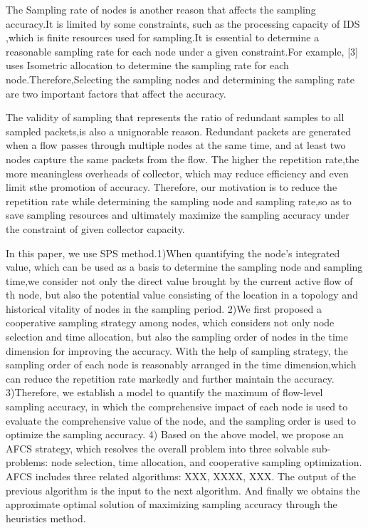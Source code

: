 \documentclass[conference]{IEEEtran}
\begin{document}
The Sampling rate of nodes is another reason that affects the sampling accuracy.It is limited by some constraints, such as the processing capacity of IDS ,which is finite resources used for sampling.It is essential to determine a reasonable sampling rate for each node under a given constraint.For example, [3] uses Isometric allocation to determine the sampling rate for each node.Therefore,Selecting the sampling nodes and determining the sampling rate are two important factors that affect the accuracy. 

The validity of sampling that represents the ratio of  redundant samples to all sampled packets,is also a unignorable reason. Redundant packets are generated when a flow passes through multiple nodes at the same time, and at least two nodes capture the same packets from the flow.
The higher the repetition rate,the more meaningless overheads of collector, which may reduce efficiency and even limit sthe promotion of accuracy. 
Therefore, our motivation is to reduce the repetition rate while determining the sampling node and sampling rate,so as to save sampling resources and ultimately maximize the sampling accuracy under the constraint of given collector capacity.

In this paper, we use SPS method.1)When quantifying the node's integrated value, which can be used as a basis to determine the sampling node and sampling time,we consider not only the direct value brought by the current active flow of th node, but also the potential value consisting of the location in a topology and historical vitality of nodes in the sampling period.
2)We first proposed a cooperative sampling strategy among nodes, which considers not only node selection and time allocation, but also the sampling order of nodes in the time dimension for improving the accuracy. With the help of sampling strategy, the sampling order of each node is reasonably arranged in the time dimension,which can reduce the repetition rate markedly and further maintain the accuracy.
3)Therefore, we establish a model to quantify the maximum of  flow-level sampling accuracy, in which  the comprehensive impact of each node is used to evaluate the comprehensive value of the node, and the sampling order is used to optimize the sampling accuracy.
4) Based on the above model, we propose an AFCS strategy, which resolves the overall problem into three solvable sub-problems: node selection, time allocation, and cooperative sampling optimization. AFCS includes three related algorithms: XXX, XXXX, XXX. The output of the previous algorithm is the input to the next algorithm. And finally we obtains the approximate optimal solution of maximizing  sampling accuracy through the heuristics method.
\end{document}
